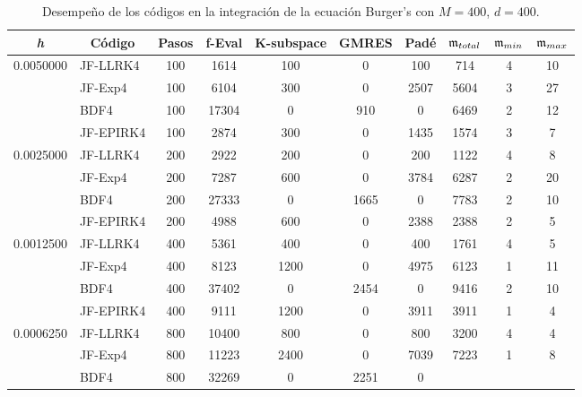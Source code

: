 \begin{table}[htb]
	\caption{Desempeño de los códigos en la integración de la ecuación Burger's con $M=400$, $d=400$.}
	\centering
	\begin{adjustbox}{width=0.9\columnwidth,center}
		\begin{tabular}{cccccccccc}
			\hline
			\textit{h} & Código & Pasos & f-Eval & K-subspace & GMRES & Padé & $\mathfrak{m}_{total}$ & $\mf%
			_{min}$ & $\mathfrak{m}_{max}$ \\ \hline
			\multicolumn{1}{l}{0.0050000} & \multicolumn{1}{l}{JF-LLRK4} & 100 & 1614 &
			100 & 0 & 100 & 714 & 4 & 10 \\
			\multicolumn{1}{l}{} & \multicolumn{1}{l}{JF-Exp4} & 100 & 6104 & 300 & 0 &
			2507 & 5604 & 3 & 27 \\
			\multicolumn{1}{l}{} & \multicolumn{1}{l}{BDF4} & 100 & 17304 & 0 & 910 & 0
			& 6469 & 2 & 12 \\
			\multicolumn{1}{l}{} & \multicolumn{1}{l}{JF-EPIRK4} & 100 & 2874 & 300 & 0 &
			1435 & 1574 & 3 & 7 \\
			\multicolumn{1}{l}{0.0025000} & \multicolumn{1}{l}{JF-LLRK4} & 200 & 2922 &
			200 & 0 & 200 & 1122 & 4 & 8 \\
			\multicolumn{1}{l}{} & \multicolumn{1}{l}{JF-Exp4} & 200 & 7287 & 600 & 0 &
			3784 & 6287 & 2 & 20 \\
			\multicolumn{1}{l}{} & \multicolumn{1}{l}{BDF4} & 200 & 27333 & 0 & 1665 & 0
			& 7783 & 2 & 10 \\
			\multicolumn{1}{l}{} & \multicolumn{1}{l}{JF-EPIRK4} & 200 & 4988 & 600 & 0 &
			2388 & 2388 & 2 & 5 \\
			\multicolumn{1}{l}{0.0012500} & \multicolumn{1}{l}{JF-LLRK4} & 400 & 5361 &
			400 & 0 & 400 & 1761 & 4 & 5 \\
			\multicolumn{1}{l}{} & \multicolumn{1}{l}{JF-Exp4} & 400 & 8123 & 1200 & 0 &
			4975 & 6123 & 1 & 11 \\
			\multicolumn{1}{l}{} & \multicolumn{1}{l}{BDF4} & 400 & 37402 & 0 & 2454 & 0
			& 9416 & 2 & 10 \\
			\multicolumn{1}{l}{} & \multicolumn{1}{l}{JF-EPIRK4} & 400 & 9111 & 1200 & 0 &
			3911 & 3911 & 1 & 4 \\
			\multicolumn{1}{l}{0.0006250} & \multicolumn{1}{l}{JF-LLRK4} & 800 & 10400 &
			800 & 0 & 800 & 3200 & 4 & 4 \\
			\multicolumn{1}{l}{} & \multicolumn{1}{l}{JF-Exp4} & 800 & 11223 & 2400 & 0
			& 7039 & 7223 & 1 & 8 \\
			\multicolumn{1}{l}{} & \multicolumn{1}{l}{BDF4} & 800 & 32269 & 0 & 2251 & 0

\end{tabular}
\end{adjustbox}
\end{table}
